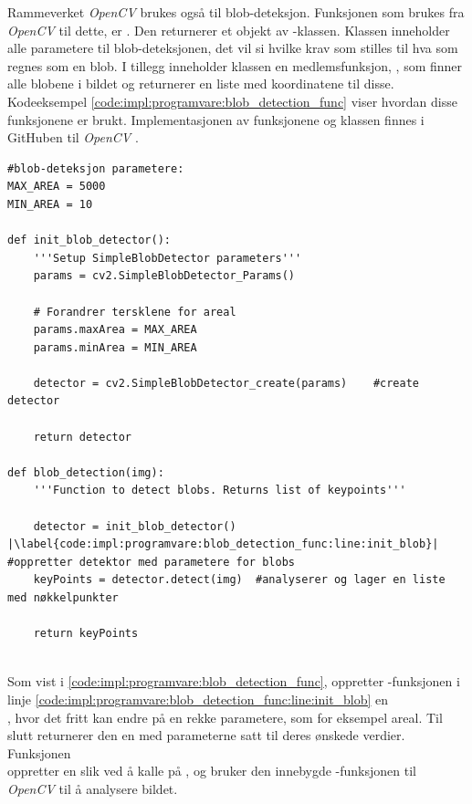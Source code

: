 Rammeverket \textit{OpenCV} brukes også til blob-deteksjon. 
Funksjonen som brukes fra \textit{OpenCV} til dette, er . 
Den returnerer et objekt av -klassen. 
Klassen inneholder alle parametere til blob-deteksjonen, det vil si hvilke krav som stilles til hva som regnes som en blob. 
I tillegg inneholder klassen en medlemsfunksjon, , som finner alle blobene i bildet og returnerer en liste med koordinatene til disse. 
Kodeeksempel \ref{code:impl:programvare:blob_detection_func} viser hvordan disse funksjonene er brukt. Implementasjonen av funksjonene og klassen finnes i GitHuben til \textit{OpenCV} \cite{OpencCV_Git}.
\begin{listing}[!htb]
\begin{verbatim}
#blob-deteksjon parametere:
MAX_AREA = 5000
MIN_AREA = 10

def init_blob_detector():
    '''Setup SimpleBlobDetector parameters'''
    params = cv2.SimpleBlobDetector_Params()

    # Forandrer tersklene for areal
    params.maxArea = MAX_AREA
    params.minArea = MIN_AREA

    detector = cv2.SimpleBlobDetector_create(params)    #create detector

    return detector
    
def blob_detection(img):
    '''Function to detect blobs. Returns list of keypoints'''

    detector = init_blob_detector() |\label{code:impl:programvare:blob_detection_func:line:init_blob}|  #oppretter detektor med parametere for blobs
    keyPoints = detector.detect(img)  #analyserer og lager en liste med nøkkelpunkter
    
    return keyPoints
    
\end{verbatim}
\caption{Implementasjon av blob-deteksjon. Merk at koden her er noe redigert for å være mer lesevennlig. Blant annet brukes flere ulike parametere. }
\label{code:impl:programvare:blob_detection_func}
\end{listing}

Som vist i \autoref{code:impl:programvare:blob_detection_func}, oppretter -funksjonen i linje \ref{code:impl:programvare:blob_detection_func:line:init_blob} en \\, hvor det fritt kan endre på en rekke parametere, som for eksempel areal.     
Til slutt returnerer den en  med parameterne satt til deres ønskede verdier. 
Funksjonen \\ oppretter en slik ved å kalle på , og bruker den innebygde -funksjonen til \textit{OpenCV} til å analysere bildet. 

